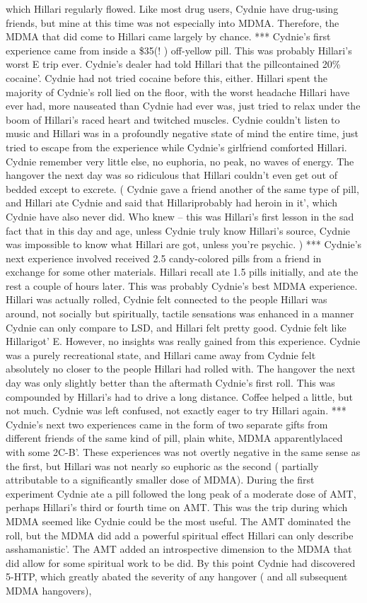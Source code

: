 \documentclass[12pt]{book}
\begin{document}
which Hillari regularly flowed. Like most drug users, Cydnie have drug-using friends, but mine at this time was not especially into MDMA. Therefore, the MDMA that did come to Hillari came largely by chance. *** Cydnie's first experience came from inside a \$35(! ) off-yellow pill. This was probably Hillari's worst E trip ever. Cydnie's dealer had told Hillari that the pillcontained 20\% cocaine'. Cydnie had not tried cocaine before this, either. Hillari spent the majority of Cydnie's roll lied on the floor, with the worst headache Hillari have ever had, more nauseated than Cydnie had ever was, just tried to relax under the boom of Hillari's raced heart and twitched muscles. Cydnie couldn't listen to music and Hillari was in a profoundly negative state of mind the entire time, just tried to escape from the experience while Cydnie's girlfriend comforted Hillari. Cydnie remember very little else, no euphoria, no peak, no waves of energy. The hangover the next day was so ridiculous that Hillari couldn't even get out of bedded except to excrete. ( Cydnie gave a friend another of the same type of pill, and Hillari ate Cydnie and said that Hillariprobably had heroin in it', which Cydnie have also never did. Who knew -- this was Hillari's first lesson in the sad fact that in this day and age, unless Cydnie truly know Hillari's source, Cydnie was impossible to know what Hillari are got, unless you're psychic. ) *** Cydnie's next experience involved received 2.5 candy-colored pills from a friend in exchange for some other materials. Hillari recall ate 1.5 pills initially, and ate the rest a couple of hours later. This was probably Cydnie's best MDMA experience. Hillari was actually rolled, Cydnie felt connected to the people Hillari was around, not socially but spiritually, tactile sensations was enhanced in a manner Cydnie can only compare to LSD, and Hillari felt pretty good. Cydnie felt like Hillarigot' E. However, no insights was really gained from this experience. Cydnie was a purely recreational state, and Hillari came away from Cydnie felt absolutely no closer to the people Hillari had rolled with. The hangover the next day was only slightly better than the aftermath Cydnie's first roll. This was compounded by Hillari's had to drive a long distance. Coffee helped a little, but not much. Cydnie was left confused, not exactly eager to try Hillari again. *** Cydnie's next two experiences came in the form of two separate gifts from different friends of the same kind of pill, plain white, MDMA apparentlylaced with some 2C-B'. These experiences was not overtly negative in the same sense as the first, but Hillari was not nearly so euphoric as the second ( partially attributable to a significantly smaller dose of MDMA). During the first experiment Cydnie ate a pill followed the long peak of a moderate dose of AMT, perhaps Hillari's third or fourth time on AMT. This was the trip during which MDMA seemed like Cydnie could be the most useful. The AMT dominated the roll, but the MDMA did add a powerful spiritual effect Hillari can only describe asshamanistic'. The AMT added an introspective dimension to the MDMA that did allow for some spiritual work to be did. By this point Cydnie had discovered 5-HTP, which greatly abated the severity of any hangover ( and all subsequent MDMA hangovers), 
\end{document}
